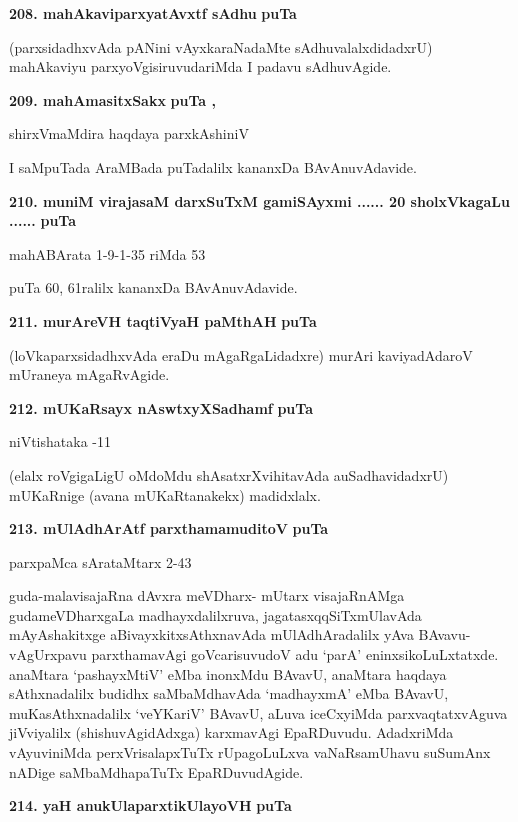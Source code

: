 \medskip
\noindent
\textbf{208. mahAkaviparxyatAvxtf sAdhu} \hfill{\bf puTa }

\smallskip
(parxsidadhxvAda pANini vAyxkaraNadaMte sAdhuvalalxdidadxrU) mahAkaviyu parxyoVgisiruvudariMda I padavu sAdhuvAgide.

\medskip
\noindent
\textbf{209. mahAmasitxSakx} \hfill{\bf puTa , }

\hfill{shirxVmaMdira haqdaya parxkAshiniV}

\smallskip
I saMpuTada AraMBada puTadalilx kananxDa BAvAnuvAdavide.

\medskip
\noindent
\textbf{210. muniM virajasaM darxSuTxM gamiSAyxmi ...... 20 sholxVkagaLu ......} \hfill{\bf puTa }

\hfill{mahABArata 1-9-1-35 riMda 53}

\smallskip
puTa 60, 61ralilx kananxDa BAvAnuvAdavide.

\noindent
\textbf{211. murAreVH taqtiVyaH paMthAH} \hfill{\bf puTa }

\smallskip
(loVkaparxsidadhxvAda eraDu mAgaRgaLidadxre) murAri kaviyadAdaroV mUraneya mAgaRvAgide.

\medskip
\noindent
\textbf{212. mUKaRsayx nAswtxyXSadhamf} \hfill{\bf puTa }

\hfill{niVtishataka -11}

(elalx roVgigaLigU oMdoMdu shAsatxrXvihitavAda auSadhavidadxrU) mUKaRnige (avana mUKaRtanakekx) madidxlalx.

\medskip
\noindent
\textbf{213. mUlAdhArAtf parxthamamuditoV} \hfill{\bf puTa }

\hfill{parxpaMca sArataMtarx 2-43}

\smallskip
guda-malavisajaRna dAvxra meVDharx- mUtarx visajaRnAMga gudameVDharxgaLa madhayxdalilxruva, jagatasxqqSiTxmUlavAda mAyAshakitxge aBivayxkitxsAthxnavAda mUlAdhAradalilx yAva BAvavu-vAgUrxpavu parxthamavAgi goVcarisuvudoV adu `parA' eninxsikoLuLxtatxde. anaMtara `pashayxMtiV' eMba inonxMdu BAvavU, anaMtara haqdaya sAthxnadalilx budidhx saMbaMdhavAda `madhayxmA' eMba BAvavU, muKasAthxnadalilx `veYKariV' BAvavU, aLuva iceCxyiMda parxvaqtatxvAguva jiVviyalilx (shishuvAgidAdxga) karxmavAgi EpaRDuvudu. AdadxriMda vAyuviniMda perxVrisalapxTuTx rUpagoLuLxva vaNaRsamUhavu suSumAnx nADige saMbaMdhapaTuTx EpaRDuvudAgide.

\medskip
\noindent
\textbf{214. yaH anukUlaparxtikUlayoVH} \hfill{\bf puTa }

